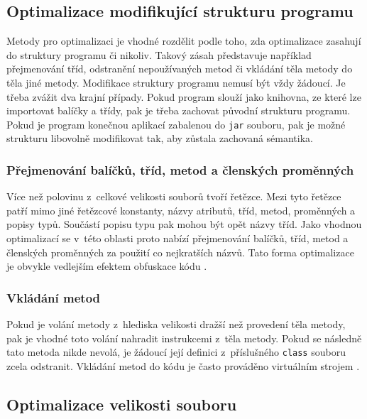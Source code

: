 \subsection{Optimalizace modifikující strukturu programu}

Metody pro optimalizaci je vhodné rozdělit podle toho, zda optimalizace zasahují do struktury programu či nikoliv. Takový zásah představuje například přejmenování tříd, odstranění nepoužívaných metod či vkládání těla metody do těla jiné metody.
Modifikace struktury programu nemusí být vždy žádoucí. Je třeba zvážit dva krajní případy. Pokud program slouží jako knihovna, ze které lze importovat balíčky a třídy, pak je třeba zachovat původní strukturu programu. Pokud je program konečnou aplikací zabalenou do \texttt{jar} souboru, pak je možné strukturu libovolně modifikovat tak, aby zůstala zachovaná sémantika.

\subsubsection{Přejmenování balíčků, tříd, metod a členských proměnných}
Více než polovinu z~celkové velikosti souborů tvoří řetězce. Mezi tyto řetězce patří mimo jiné řetězcové konstanty, názvy atributů, tříd, metod, proměnných a popisy typů. Součástí popisu typu pak mohou být opět názvy tříd. Jako vhodnou optimalizací se v~této oblasti proto nabízí přejmenování balíčků, tříd, metod a členských proměnných za použití co nejkratších názvů. Tato forma optimalizace je obvykle vedlejším efektem obfuskace kódu \cite{}.

\subsubsection{Vkládání metod}
Pokud je volání metody z~hlediska velikosti dražší než provedení těla metody, pak je vhodné toto volání nahradit instrukcemi z~těla metody. Pokud se následně tato metoda nikde nevolá, je žádoucí její definici z~příslušného \texttt{class} souboru zcela odstranit. Vkládání metod do kódu je často prováděno virtuálním strojem \cite{}.


\subsection{Optimalizace velikosti souboru}

